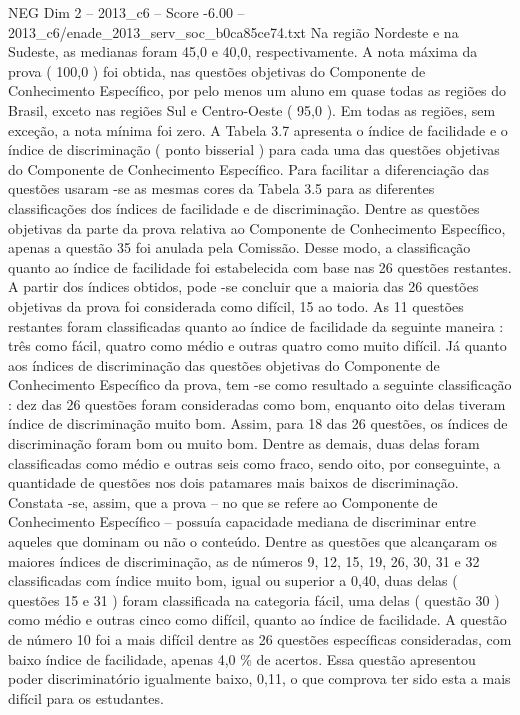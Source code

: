 \begin{textsample}{NEG Dim 2 – 2013\_c6 – Score -6.00 – 2013\_c6/enade\_2013\_serv\_soc\_b0ca85ce74.txt}
Na região Nordeste e na Sudeste, as medianas foram 45,0 e 40,0, respectivamente.
A nota máxima da prova ( 100,0 ) foi obtida, nas questões objetivas do Componente de Conhecimento Específico, por pelo menos um aluno em quase todas as regiões do Brasil, exceto nas regiões Sul e Centro-Oeste ( 95,0 ).
Em todas as regiões, sem exceção, a nota mínima foi zero.
A Tabela 3.7 apresenta o índice de facilidade e o índice de discriminação ( ponto bisserial ) para cada uma das questões objetivas do Componente de Conhecimento Específico.
Para facilitar a diferenciação das questões usaram -se as mesmas cores da Tabela 3.5 para as diferentes classificações dos índices de facilidade e de discriminação.
Dentre as questões objetivas da parte da prova relativa ao Componente de Conhecimento Específico, apenas a questão 35 foi anulada pela Comissão.
Desse modo, a classificação quanto ao índice de facilidade foi estabelecida com base nas 26 questões restantes.
A partir dos índices obtidos, pode -se concluir que a maioria das 26 questões objetivas da prova foi considerada como difícil, 15 ao todo.
As 11 questões restantes foram classificadas quanto ao índice de facilidade da seguinte maneira : três como fácil, quatro como médio e outras quatro como muito difícil.
Já quanto aos índices de discriminação das questões objetivas do Componente de Conhecimento Específico da prova, tem -se como resultado a seguinte classificação : dez das 26 questões foram consideradas como bom, enquanto oito delas tiveram índice de discriminação muito bom.
Assim, para 18 das 26 questões, os índices de discriminação foram bom ou muito bom.
Dentre as demais, duas delas foram classificadas como médio e outras seis como fraco, sendo oito, por conseguinte, a quantidade de questões nos dois patamares mais baixos de discriminação.
Constata -se, assim, que a prova – no que se refere ao Componente de Conhecimento Específico – possuía capacidade mediana de discriminar entre aqueles que dominam ou não o conteúdo.
Dentre as questões que alcançaram os maiores índices de discriminação, as de números 9, 12, 15, 19, 26, 30, 31 e 32 classificadas com índice muito bom, igual ou superior a 0,40, duas delas ( questões 15 e 31 ) foram classificada na categoria fácil, uma delas ( questão 30 ) como médio e outras cinco como difícil, quanto ao índice de facilidade.
A questão de número 10 foi a mais difícil dentre as 26 questões específicas consideradas, com baixo índice de facilidade, apenas 4,0 \% de acertos.
Essa questão apresentou poder discriminatório igualmente baixo, 0,11, o que comprova ter sido esta a mais difícil para os estudantes.

\end{textsample}
